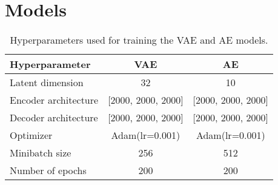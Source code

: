 \documentclass[conference,a4paper]{IEEEtran}
\begin{document}



\appendix

\section{Models}

\begin{table}
\caption{Hyperparameters used for training the VAE and AE models.}
\label{tab:hyperparams}
\centering
\begin{tabular}{l|c|c}
\toprule
\textbf{Hyperparameter} & \textbf{VAE} & \textbf{AE} \\
\midrule
Latent dimension & 32 & 10 \\
Encoder architecture & [2000, 2000, 2000] & [2000, 2000, 2000] \\
Decoder architecture & [2000, 2000, 2000] & [2000, 2000, 2000] \\
Optimizer & Adam(lr=0.001) & Adam(lr=0.001) \\
Minibatch size & 256 & 512 \\
Number of epochs & 200 & 200 \\
\end{tabular}
\end{table}
\end{document}

